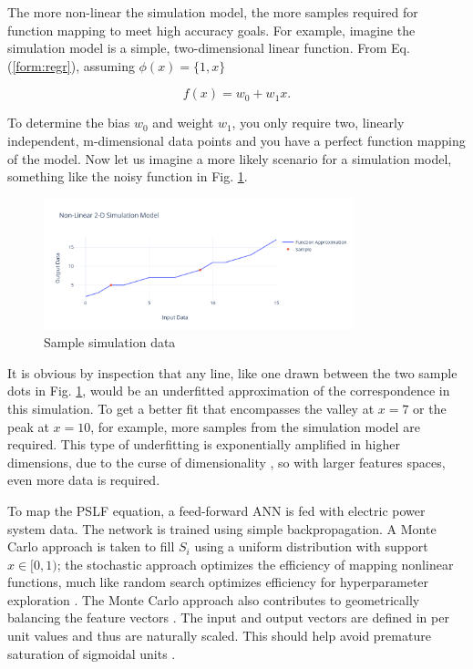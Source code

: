 \documentclass[conference]{IEEEtran}
\begin{document}
The more non-linear the simulation model, the more samples required for function mapping to meet high accuracy goals. For example, imagine the simulation model is a simple, two-dimensional linear function. From Eq. (\ref{form:regr}), assuming $\phi(x) = \{1, x\}$

\begin{equation} f(x) = w_{0} + w_{1} x. \label{form: line} \end{equation}

To determine the bias $w_{0}$ and weight $w_{1}$, you only require two, linearly independent, m-dimensional data points and you have a perfect function mapping of the model. Now let us imagine a more likely scenario for a simulation model,  something like the noisy function in Fig. \ref{fig:simdata}.

\setcounter{figure}{1} %
\begin{figure}[H]
	\centering
	\includegraphics[width=9cm]{simdata.pdf}
	\caption{Sample simulation data}
	\label{fig:simdata}
\end{figure}

It is obvious by inspection that any line, like one drawn between the two sample dots in Fig. \ref{fig:simdata}, would be an underfitted approximation of the correspondence in this simulation. To get a better fit that encompasses the valley at $x = 7$ or the peak at $x  =10$, for example, more samples from the simulation model are required. This type of underfitting is exponentially amplified in higher dimensions, due to the curse of dimensionality \cite{geen2011}, so with larger features spaces, even more data is required.

To map the PSLF equation, a feed-forward ANN is fed with electric power system data. The network is trained using simple backpropagation. A Monte Carlo approach is taken to fill $S_{i}$ using a uniform distribution with support $x \in [0, 1)$; the stochastic approach optimizes the efficiency of mapping nonlinear functions, much like random search optimizes efficiency for hyperparameter exploration \cite{berg2012}. The Monte Carlo approach also contributes to geometrically balancing the feature vectors \cite{kraw2016}. The input and output vectors are defined in per unit values and thus are naturally scaled. This should help avoid premature saturation of sigmoidal units \cite{khom2007}.
\end{document}
